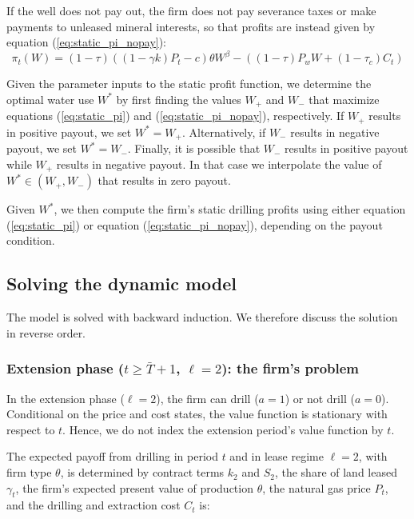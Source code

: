 \documentclass[12pt]{article}
\begin{document}
If the well does not pay out, the firm does not pay severance taxes or make payments to unleased mineral interests, so that profits are instead given by equation (\ref{eq:static_pi_nopay}):
\begin{equation}
\pi_t(W) = (1-\tau)((1-\gamma k)P_t-c)\theta W^{\beta} - ((1-\tau) P_w W + (1-\tau_c) C_t) \label{eq:static_pi_nopay}
\end{equation}

Given the parameter inputs to the static profit function, we determine the optimal water use $W^*$ by first finding the values $W_{+}$ and $W_{-}$ that maximize equations (\ref{eq:static_pi}) and (\ref{eq:static_pi_nopay}), respectively. If $W_{+}$ results in positive payout, we set $W^*=W_{+}$. Alternatively, if $W_{-}$ results in negative payout, we set $W^*=W_{-}$. Finally, it is possible that $W_{-}$ results in positive payout while $W_{+}$  results in negative payout. In that case we interpolate the value of $W^*\in(W_{+},W_{-})$ that results in zero payout.

Given $W^*$, we then compute the firm's static drilling profits using either equation (\ref{eq:static_pi}) or equation (\ref{eq:static_pi_nopay}), depending on the payout condition.

\subsection{Solving the dynamic model}
The model is solved with backward induction. We therefore discuss the solution in reverse order.

\subsubsection{Extension phase ($t \geq \bar{T} + 1$, $\ell=2$): the firm's problem}
\label{subsub:firm_extension}

In the extension phase ($\ell=2$), the firm can drill ($a=1$) or not drill ($a=0$). Conditional on the price and cost states, the value function is stationary with respect to $t$. Hence, we do not index the extension period's value function by $t$.

The expected payoff from drilling in period $t$ and in lease regime $\ell=2$, with firm type $\theta$, is determined by contract terms $k_{2}$ and $S_2$, the share of land leased $\gamma_{t}$, the firm's expected present value of production $\theta$, the natural gas price $P_t$, and the drilling and extraction cost $C_t$ is:
\end{document}
